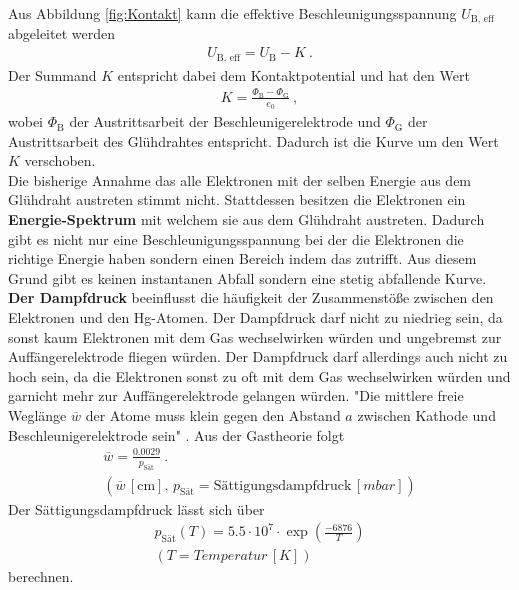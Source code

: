 Aus Abbildung \eqref{fig:Kontakt} kann die effektive Beschleunigungsspannung $U_\text{B, eff}$ abgeleitet werden
\begin{align*}
	U_\text{B, eff} = U_\text{B} - K \ .
\end{align*}
Der Summand $K$ entspricht dabei dem Kontaktpotential und hat den Wert
\begin{align*}
	K = \frac{\Phi_\text{B} - \Phi_\text{G}}{e_0} \ ,
\end{align*}
wobei $\Phi_\text{B}$ der Austrittsarbeit der Beschleunigerelektrode und $\Phi_\text{G}$ der Austrittsarbeit des Glühdrahtes entspricht. Dadurch ist die Kurve um den Wert $K$ verschoben. \\
Die bisherige Annahme das alle Elektronen mit der selben Energie aus dem Glühdraht austreten stimmt nicht. Stattdessen besitzen die Elektronen ein \textbf{Energie-Spektrum} mit welchem sie aus dem Glühdraht austreten. Dadurch gibt es nicht nur eine Beschleunigungsspannung bei der die Elektronen die richtige Energie haben sondern einen Bereich indem das zutrifft. Aus diesem Grund gibt es keinen instantanen Abfall sondern eine stetig abfallende Kurve. \\
\textbf{Der Dampfdruck} beeinflusst die häufigkeit der Zusammenstöße zwischen den Elektronen und den Hg-Atomen. Der Dampfdruck darf nicht zu niedrieg sein, da sonst kaum Elektronen mit dem Gas wechselwirken würden und ungebremst zur Auffängerelektrode fliegen würden. Der Dampfdruck darf allerdings auch nicht zu hoch sein, da die Elektronen sonst zu oft mit dem Gas wechselwirken würden und garnicht mehr zur Auffängerelektrode gelangen würden. "Die mittlere freie Weglänge $\overline{w}$ der Atome muss klein gegen den Abstand $a$ zwischen Kathode und Beschleunigerelektrode sein" \cite[6]{sample}. Aus der Gastheorie folgt
\begin{align*}
	\overline{w} = \frac{0.0029}{p_\text{Sät}} \ . \\
	(\overline{w}\, [\text{cm}],\, p_\text{Sät} = \text{Sättigungsdampfdruck}\, [mbar])
\end{align*}
Der Sättigungsdampfdruck lässt sich über
\begin{align*}
	p_\text{Sät}(T) = 5.5 \cdot 10^7 \cdot \exp(\frac{-6876}{T}) \\
	(T = Temperatur\, [K])
\end{align*}
berechnen.

























